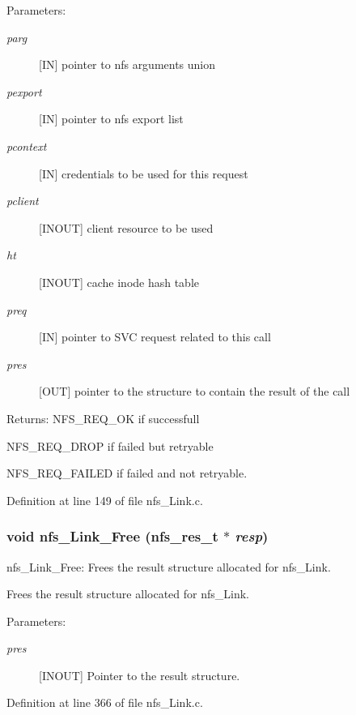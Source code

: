 \begin{Desc}
\item[Parameters:]
\begin{description}
\item[{\em parg}][IN] pointer to nfs arguments union \item[{\em pexport}][IN] pointer to nfs export list \item[{\em pcontext}][IN] credentials to be used for this request \item[{\em pclient}][INOUT] client resource to be used \item[{\em ht}][INOUT] cache inode hash table \item[{\em preq}][IN] pointer to SVC request related to this call \item[{\em pres}][OUT] pointer to the structure to contain the result of the call\end{description}
\end{Desc}
\begin{Desc}
\item[Returns:]NFS\_\-REQ\_\-OK if successfull \par
 NFS\_\-REQ\_\-DROP if failed but retryable \par
 NFS\_\-REQ\_\-FAILED if failed and not retryable. \end{Desc}


Definition at line 149 of file nfs\_\-Link.c.
\subsubsection[{nfs\_\-Link\_\-Free}]{\setlength{\rightskip}{0pt plus 5cm}void nfs\_\-Link\_\-Free (nfs\_\-res\_\-t $\ast$ {\em resp})}\label{nfs__Link_8c_6c80f148619689895f7abf0ba965d5d2}


nfs\_\-Link\_\-Free: Frees the result structure allocated for nfs\_\-Link.

Frees the result structure allocated for nfs\_\-Link.

\begin{Desc}
\item[Parameters:]
\begin{description}
\item[{\em pres}][INOUT] Pointer to the result structure. \end{description}
\end{Desc}


Definition at line 366 of file nfs\_\-Link.c.